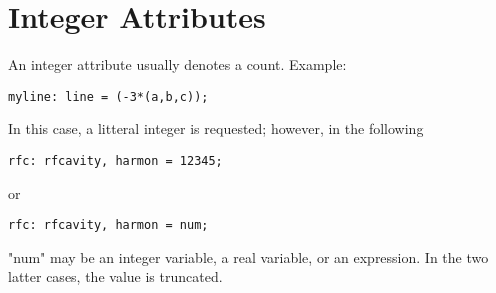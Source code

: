 
\section{Integer Attributes}

An integer attribute usually denotes a count. Example: 
\begin{verbatim}
myline: line = (-3*(a,b,c));
\end{verbatim} 

In this case, a litteral integer is requested; however, in the following 
\begin{verbatim}
rfc: rfcavity, harmon = 12345;
\end{verbatim} 

or 
\begin{verbatim}
rfc: rfcavity, harmon = num;
\end{verbatim} 

"num" may be an integer variable, a real variable, or an expression.  In
the two latter cases, the value is truncated. 


